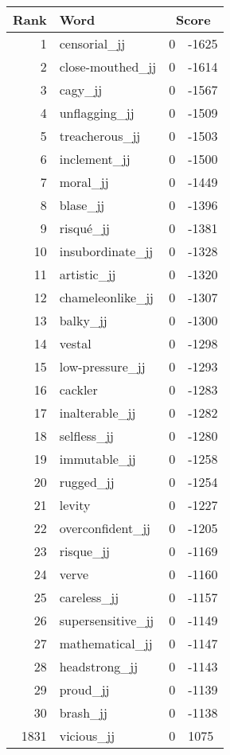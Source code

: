 \begin{longtable}[!htbp]{| rlr@{.}l |}
    \hline
    \textbf{Rank} & \textbf{Word} & \multicolumn{2}{c|}{\textbf{Score}} \\
    \hline
    \endhead
    1 & censorial\_jj & 0 & -1625 \\
    2 & close-mouthed\_jj & 0 & -1614 \\
    3 & cagy\_jj & 0 & -1567 \\
    4 & unflagging\_jj & 0 & -1509 \\
    5 & treacherous\_jj & 0 & -1503 \\
    6 & inclement\_jj & 0 & -1500 \\
    7 & moral\_jj & 0 & -1449 \\
    8 & blase\_jj & 0 & -1396 \\
    9 & risqué\_jj & 0 & -1381 \\
    10 & insubordinate\_jj & 0 & -1328 \\
    11 & artistic\_jj & 0 & -1320 \\
    12 & chameleonlike\_jj & 0 & -1307 \\
    13 & balky\_jj & 0 & -1300 \\
    14 & vestal & 0 & -1298 \\
    15 & low-pressure\_jj & 0 & -1293 \\
    16 & cackler & 0 & -1283 \\
    17 & inalterable\_jj & 0 & -1282 \\
    18 & selfless\_jj & 0 & -1280 \\
    19 & immutable\_jj & 0 & -1258 \\
    20 & rugged\_jj & 0 & -1254 \\
    21 & levity & 0 & -1227 \\
    22 & overconfident\_jj & 0 & -1205 \\
    23 & risque\_jj & 0 & -1169 \\
    24 & verve & 0 & -1160 \\
    25 & careless\_jj & 0 & -1157 \\
    26 & supersensitive\_jj & 0 & -1149 \\
    27 & mathematical\_jj & 0 & -1147 \\
    28 & headstrong\_jj & 0 & -1143 \\
    29 & proud\_jj & 0 & -1139 \\
    30 & brash\_jj & 0 & -1138 \\
    1831 & vicious\_jj & 0 & 1075 \\

\end{longtable}
